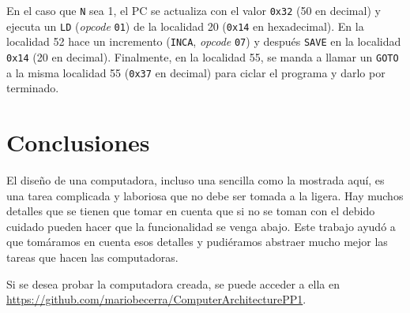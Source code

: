 \documentclass{article}
\begin{document}
En el caso que \texttt{N} sea 1, el PC se actualiza con el valor \texttt{0x32} (50 en decimal) y ejecuta un \texttt{LD} (\textit{opcode} \texttt{01}) de la localidad 20 (\texttt{0x14} en hexadecimal). En la localidad 52 hace un incremento (\texttt{INCA}, \textit{opcode} \texttt{07}) y después \texttt{SAVE} en la localidad \texttt{0x14} (20 en decimal). Finalmente, en la localidad 55, se manda a llamar un \texttt{GOTO} a la misma localidad 55 (\texttt{0x37} en decimal) para ciclar el programa y darlo por terminado.

\section{Conclusiones}

El diseño de una computadora, incluso una sencilla como la mostrada aquí, es una tarea complicada y laboriosa que no debe ser tomada a la ligera. Hay muchos detalles que se tienen que tomar en cuenta que si no se toman con el debido cuidado pueden hacer que la funcionalidad se venga abajo. Este trabajo ayudó a que tomáramos en cuenta esos detalles y pudiéramos abstraer mucho mejor las tareas que hacen las computadoras.

Si se desea probar la computadora creada, se puede acceder a ella en \\ \url{https://github.com/mariobecerra/ComputerArchitecturePP1}.

\printbibliography
\nocite{*}
\end{document}
